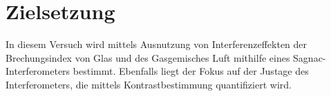 \section{Zielsetzung}
\label{sec:Zielsetzung}
In diesem Versuch wird mittels Ausnutzung von Interferenzeffekten der Brechungsindex von Glas und des Gasgemisches Luft mithilfe eines Sagnac-Interferometers bestimmt.
Ebenfalls liegt der Fokus auf der Justage des Interferometers, die mittels Kontrastbestimmung quantifiziert wird.